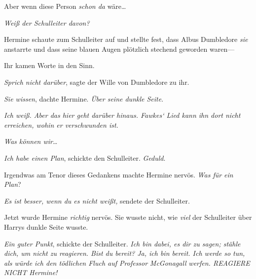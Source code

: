 Aber wenn diese Person \emph{schon da} wäre…

\emph{Weiß der Schulleiter davon?}

Hermine schaute zum Schulleiter auf und stellte fest, dass Albus Dumbledore \emph{sie} anstarrte und dass seine blauen Augen plötzlich stechend geworden waren—

Ihr kamen Worte in den Sinn.

\emph{Sprich nicht darüber}, sagte der Wille von Dumbledore zu ihr.

\emph{Sie wissen}, dachte Hermine. \emph{Über seine dunkle Seite}.

\emph{Ich weiß. Aber das hier geht darüber hinaus. Fawkes‘ Lied kann ihn dort nicht erreichen, wohin er verschwunden ist.}

\emph{Was können wir}…

\emph{Ich habe einen Plan}, schickte den Schulleiter. \emph{Geduld}.

Irgendwas am Tenor dieses Gedankens machte Hermine nervös. \emph{Was für ein Plan}?

\emph{Es ist besser, wenn du es nicht weißt,} sendete der Schulleiter.

Jetzt wurde Hermine \emph{richtig} nervös. Sie wusste nicht, wie \emph{viel} der Schulleiter über Harrys dunkle Seite wusste.

\emph{Ein guter Punkt}, schickte der Schulleiter. \emph{Ich bin dabei, es dir zu sagen; stähle dich, um nicht zu reagieren. Bist du bereit? Ja, ich bin bereit. Ich werde so tun, als würde ich den tödlichen Fluch auf Professor} \emph{McGonagall} \emph{werfen. REAGIERE NICHT Hermine!}

